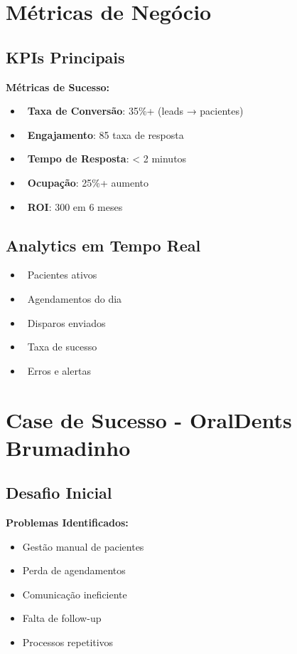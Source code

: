 \documentclass[11pt,a4paper]{article}
\newcommand{\sectiontitle}[1]{\section{\color{oraldentsblue}#1}}
\begin{document}
\sectiontitle{Métricas de Negócio}

\subsection{KPIs Principais}
\begin{tcolorbox}[colback=green!5!white,colframe=successgreen]
\textbf{Métricas de Sucesso:}
\begin{itemize}
    \item \faChartLine\ \textbf{Taxa de Conversão}: 35\%+ (leads → pacientes)
    \item \faComments\ \textbf{Engajamento}: 85\+ taxa de resposta
    \item \faClock\ \textbf{Tempo de Resposta}: < 2 minutos
    \item \faCalendarCheck\ \textbf{Ocupação}: 25\%+ aumento
    \item \faDollarSign\ \textbf{ROI}: 300\+ em 6 meses
\end{itemize}
\end{tcolorbox}

\subsection{Analytics em Tempo Real}
\begin{itemize}
    \item \faUsers\ Pacientes ativos
    \item \faCalendarAlt\ Agendamentos do dia
    \item \faPaperPlane\ Disparos enviados
    \item \faCheckCircle\ Taxa de sucesso
    \item \faExclamationTriangle\ Erros e alertas
\end{itemize}

\sectiontitle{Case de Sucesso - OralDents Brumadinho}

\subsection{Desafio Inicial}
\begin{tcolorbox}[colback=amber!5!white,colframe=warningamber]
\textbf{Problemas Identificados:}
\begin{itemize}
    \item Gestão manual de pacientes
    \item Perda de agendamentos
    \item Comunicação ineficiente
    \item Falta de follow-up
    \item Processos repetitivos
\end{itemize}
\end{tcolorbox}
\end{document}
